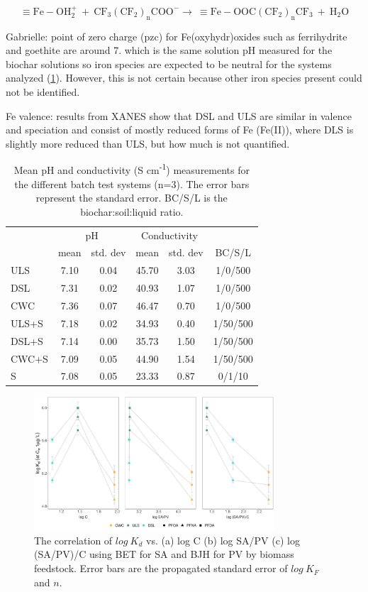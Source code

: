 \begin{equation}
    \mathrm{\equiv Fe-OH_2^+~ + ~ CF_3(CF_2)_nCOO^- \rightarrow   ~ \equiv Fe-OOC(CF_2)_nCF_3 ~+~ H_2O}
\end{equation}

Gabrielle: point of zero charge (pzc) for Fe(oxyhydr)oxides such as ferrihydrite and goethite are around 7. which is the same solution pH measured for the biochar solutions so iron species are expected to be neutral for the systems analyzed (\cref{tab:pHcond}). However, this is not certain because other iron species present could not be identified. 

Fe valence: results from XANES show that DSL and ULS are similar in valence and speciation and consist of mostly reduced forms of Fe (Fe(II)), where DLS is slightly more reduced than ULS, but how much is not quantified. 

\begin{table}
\centering
\caption{Mean pH and conductivity (\textmu S cm\textsuperscript{-1}) measurements for the different batch test systems (n=3). The error bars represent the standard error. BC/S/L is the biochar:soil:liquid ratio.}
\label{tab:pHcond}
\begin{tabular}{lccccc}
\toprule
 & \multicolumn{2}{c}{pH} & \multicolumn{2}{c}{Conductivity} & \\ \cmidrule(l){2-3} \cmidrule(l){4-5}
 & mean & std. dev & mean & std. dev & BC/S/L\\ 
\midrule
ULS & 7.10 & 0.04 & 45.70 & 3.03 & 1/0/500\\
DSL & 7.31 & 0.02 & 40.93 & 1.07 & 1/0/500\\
CWC & 7.36 & 0.07 & 46.47 & 0.70 & 1/0/500\\
ULS+S & 7.18 & 0.02 & 34.93 & 0.40 & 1/50/500\\
DSL+S & 7.14 & 0.00 & 35.73 & 1.50 & 1/50/500\\
CWC+S & 7.09 & 0.05 & 44.90 & 1.54 & 1/50/500\\
S & 7.08 & 0.05 & 23.33 & 0.87 & 0/1/10\\
\bottomrule
\end{tabular}
\end{table}

\begin{figure}[htb]
    \centering
    \includegraphics[width=0.8\textwidth]{R/figs/SAPV_C_Kd1ugL_plot.pdf}
    \caption{The correlation of $log~K_d$ vs. (a) log C (b) log SA/PV (c) log (SA/PV)/C using BET for SA and BJH for PV by biomass feedstock. Error bars are the propagated standard error of $log~K_F$ and $n$.}
    \label{fig:Kd_SAPV_C}
\end{figure}

